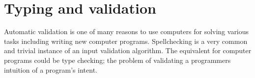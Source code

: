 \documentclass[11pt,oneside,a4paper]{report}
\begin{document}
\chapter{Typing and validation}
Automatic validation is one of many reasons to use computers for solving various tasks including writing new computer programs.
Spellchecking is a very common and trivial instance of an input validation algorithm. 
The equivalent for computer programs could be type checking; the problem of validating a programmers intuition of a program's intent.


\end{document}
